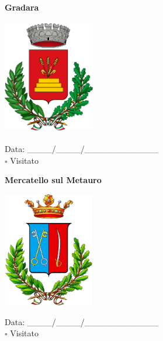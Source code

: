 \documentclass[a5paper,12pt]{article}
\begin{document}
\vspace{0.7cm}

\noindent
\begin{minipage}[t]{0.45\textwidth}
    \begin{center}
        \textbf{Gradara}
    \end{center}
    \vspace{-0.5cm} %
    \begin{center}
        \includegraphics[height= 5cm, width=4cm]{Marche/Stemma Gradara.png}
    \end{center}
    \vspace{-0.4cm} %
    \begin{flushleft}
        Data: \_\_\_\_/\_\_\_\_/\_\_\_\_\_\_\_\_\_\_\_\_ \\
        $\square$ Visitato
    \end{flushleft}
\end{minipage}
\hfill
\noindent
\begin{minipage}[t]{0.45\textwidth}
    \begin{center}
        \textbf{Mercatello sul Metauro}
    \end{center}
    \vspace{-0.5cm} %
    \begin{center}
        \includegraphics[height= 5cm, width=4cm]{Marche/Stemma Mercatello sul Metauro.png}
    \end{center}
    \vspace{-0.4cm} %
    \begin{flushleft}
        Data: \_\_\_\_/\_\_\_\_/\_\_\_\_\_\_\_\_\_\_\_\_ \\
        $\square$ Visitato
    \end{flushleft}
\end{minipage}
\end{document}
